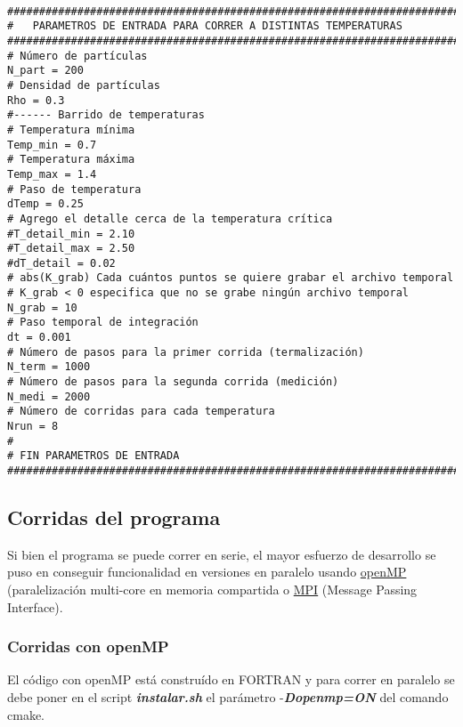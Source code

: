 \begin{verbatim}

###############################################################################       
#   PARAMETROS DE ENTRADA PARA CORRER A DISTINTAS TEMPERATURAS
###############################################################################
# Número de partículas
N_part = 200
# Densidad de partículas
Rho = 0.3
#------ Barrido de temperaturas
# Temperatura mínima
Temp_min = 0.7
# Temperatura máxima
Temp_max = 1.4
# Paso de temperatura
dTemp = 0.25
# Agrego el detalle cerca de la temperatura crítica
#T_detail_min = 2.10
#T_detail_max = 2.50
#dT_detail = 0.02
# abs(K_grab) Cada cuántos puntos se quiere grabar el archivo temporal
# K_grab < 0 especifica que no se grabe ningún archivo temporal
N_grab = 10
# Paso temporal de integración
dt = 0.001
# Número de pasos para la primer corrida (termalización)
N_term = 1000
# Número de pasos para la segunda corrida (medición)
N_medi = 2000
# Número de corridas para cada temperatura
Nrun = 8
#
# FIN PARAMETROS DE ENTRADA
###############################################################################

\end{verbatim}
\endgroup

\subsection{Corridas del programa}

Si bien el programa se puede correr en serie, el mayor esfuerzo de desarrollo se puso en conseguir
funcionalidad en versiones en paralelo 
 usando  \href{http://openmp.org/}{openMP} 
(paralelización multi-core en memoria compartida   o \href{http://www.open-mpi.org/}{MPI} (Message Passing Interface).

\begin{comment}
\subsubsection{Corridas en serie}
Para correr en serie se debe poner en el script \textbf{\textit{instalar.sh}}
el parámetro -\textbf{\textit{Dopenmp=OFF}} del comando cmake.
\end{comment}

\subsubsection{Corridas con openMP}
El código con openMP está construído en FORTRAN y para correr en paralelo se debe poner en el script \textbf{\textit{instalar.sh}}
el parámetro -\textbf{\textit{Dopenmp=ON}} del comando cmake.

